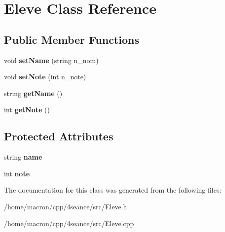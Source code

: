 \hypertarget{classEleve}{}\section{Eleve Class Reference}
\label{classEleve}
\subsection*{Public Member Functions}
\begin{DoxyCompactItemize}
\item 
\mbox{\label{classEleve_a5e578b1a85ab8542b68d66c8ccefad09}} 
void {\bfseries set\+Name} (string n\+\_\+nom)
\item 
\mbox{\label{classEleve_ab56bcbb3ced46db6ac61cee92b8928c1}} 
void {\bfseries set\+Note} (int n\+\_\+note)
\item 
\mbox{\label{classEleve_a56d4714540b04eefb19ff58d803b4384}} 
string {\bfseries get\+Name} ()
\item 
\mbox{\label{classEleve_ae49c8d7dcbfc67e564a659160219a4a6}} 
int {\bfseries get\+Note} ()
\end{DoxyCompactItemize}
\subsection*{Protected Attributes}
\begin{DoxyCompactItemize}
\item 
\mbox{\label{classEleve_a21d762bdc8cb5dbc2c3ffe20b6e6709d}} 
string {\bfseries name}
\item 
\mbox{\label{classEleve_a059b279278248d3ecbf8bee2c1be1c3b}} 
int {\bfseries note}
\end{DoxyCompactItemize}


The documentation for this class was generated from the following files\+:\begin{DoxyCompactItemize}
\item 
/home/macron/cpp/4seance/src/Eleve.\+h\item 
/home/macron/cpp/4seance/src/Eleve.\+cpp\end{DoxyCompactItemize}
